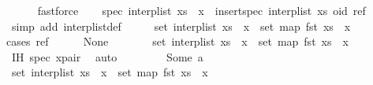 \begin{isabellebody}
\ \ \ \ \isamarkupfalse%
\ fastforce\isanewline
\ \ \isamarkupfalse%
\ spec{\isacharcolon}\ {\isachardoublequoteopen}interp{\isacharunderscore}list\ {\isacharparenleft}xs\ {\isacharat}\ {\isacharbrackleft}x{\isacharbrackright}{\isacharparenright}\ {\isacharequal}\ insert{\isacharunderscore}spec\ {\isacharparenleft}interp{\isacharunderscore}list\ xs{\isacharparenright}\ {\isacharparenleft}oid{\isacharcomma}\ ref{\isacharparenright}{\isachardoublequoteclose}\isanewline
\ \ \ \ \isamarkupfalse%
\ {\isacharparenleft}simp\ add{\isacharcolon}\ interp{\isacharunderscore}list{\isacharunderscore}def{\isacharparenright}\isanewline
\ \ \isamarkupfalse%
\ \isamarkupfalse%
\ {\isachardoublequoteopen}set\ {\isacharparenleft}interp{\isacharunderscore}list\ {\isacharparenleft}xs\ {\isacharat}\ {\isacharbrackleft}x{\isacharbrackright}{\isacharparenright}{\isacharparenright}\ {\isasymsubseteq}\ set\ {\isacharparenleft}map\ fst\ {\isacharparenleft}xs\ {\isacharat}\ {\isacharbrackleft}x{\isacharbrackright}{\isacharparenright}{\isacharparenright}{\isachardoublequoteclose}\isanewline
\ \ \isamarkupfalse%
{\isacharparenleft}cases\ ref{\isacharparenright}\isanewline
\ \ \ \ \isamarkupfalse%
\ None\isanewline
\ \ \ \ \isamarkupfalse%
\ \isamarkupfalse%
\ {\isachardoublequoteopen}set\ {\isacharparenleft}interp{\isacharunderscore}list\ {\isacharparenleft}xs\ {\isacharat}\ {\isacharbrackleft}x{\isacharbrackright}{\isacharparenright}{\isacharparenright}\ {\isasymsubseteq}\ set\ {\isacharparenleft}map\ fst\ {\isacharparenleft}xs\ {\isacharat}\ {\isacharbrackleft}x{\isacharbrackright}{\isacharparenright}{\isacharparenright}{\isachardoublequoteclose}\isanewline
\ \ \ \ \ \ \isamarkupfalse%
\ IH\ spec\ x{\isacharunderscore}pair\ \isamarkupfalse%
\ auto\isanewline
\ \ \isamarkupfalse%
\isanewline
\ \ \ \ \isamarkupfalse%
\ {\isacharparenleft}Some\ a{\isacharparenright}\isanewline
\ \ \ \ \isamarkupfalse%
\ \isamarkupfalse%
\ {\isachardoublequoteopen}set\ {\isacharparenleft}interp{\isacharunderscore}list\ {\isacharparenleft}xs\ {\isacharat}\ {\isacharbrackleft}x{\isacharbrackright}{\isacharparenright}{\isacharparenright}\ {\isasymsubseteq}\ set\ {\isacharparenleft}map\ fst\ {\isacharparenleft}xs\ {\isacharat}\ {\isacharbrackleft}x{\isacharbrackright}{\isacharparenright}{\isacharparenright}{\isachardoublequoteclose}\isanewline
\ \ \ \ \ \ \isamarkupfalse%

\end{isabellebody}
